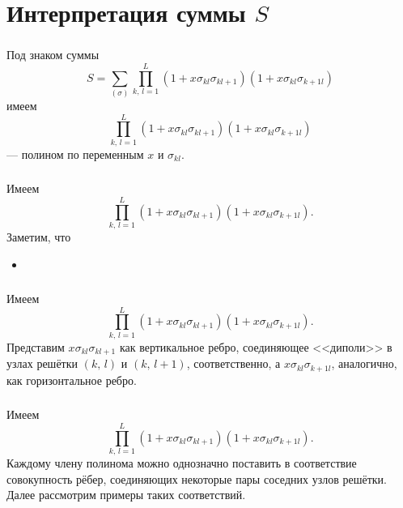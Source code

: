 \documentclass[c]{beamer}
\begin{document}
\section{Интерпретация суммы $S$}
\begin{frame}
\frametitle{\insertsection}
Под знаком суммы
\[
	S= \sum_{(\sigma)}^{} \prod_{k,\,l=1}^{L} (1+x \sigma_{kl}
	\sigma_{kl+1})(1+x \sigma_{kl} \sigma_{k+1l})
\]
имеем
\[
	\prod_{k,\,l=1}^{L} (1+x \sigma_{kl}
	\sigma_{kl+1})(1+x \sigma_{kl} \sigma_{k+1l})
\] 
--- полином по переменным $x$ и $\sigma_{kl}$.
\end{frame}
\begin{frame}
\frametitle{\insertsection}
Имеем
\[
	\prod_{k,\,l=1}^{L} (1+x \sigma_{kl}
	\sigma_{kl+1})(1+x \sigma_{kl} \sigma_{k+1l})
.\]
Заметим, что
\begin{itemize}
\item {}
\end{itemize}
\end{frame}
\begin{frame}
\frametitle{\insertsection}
Имеем
\[
	\prod_{k,\,l=1}^{L} (1+x \sigma_{kl}
	\sigma_{kl+1})(1+x \sigma_{kl} \sigma_{k+1l})
.\]
Представим $x\sigma_{kl}\sigma_{kl+1}$ как вертикальное ребро,
соединяющее <<диполи>> в узлах решётки $(k,\,l)$ и
$(k,\,l+1)$, соответственно, а $x\sigma_{kl}\sigma_{k+1l}$,
аналогично,
как горизонтальное ребро.
\begin{center}
\end{center}

\end{frame}
\begin{frame}
\frametitle{\insertsection}
Имеем
\[
	\prod_{k,\,l=1}^{L} (1+x \sigma_{kl}
	\sigma_{kl+1})(1+x \sigma_{kl} \sigma_{k+1l})
.\]
Каждому члену полинома можно однозначно поставить в соответствие
совокупность рёбер, соединяющих некоторые пары соседних узлов
решётки. Далее рассмотрим примеры таких соответствий.
\end{frame}
\end{document}
